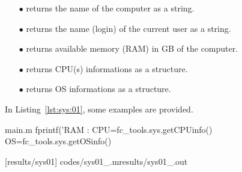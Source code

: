 
\begin{itemize}
\item[$\bullet$]  returns the name of the computer as a string.
\item[$\bullet$]  returns the name (login) of the current user as a string.
\item[$\bullet$]  returns available memory (RAM) in GB of the computer.
\item[$\bullet$]  returns CPU(s) informations as a structure.
\item[$\bullet$]  returns OS informations as a structure.
\end{itemize}

In Listing~\ref{lst:sys:01}, some examples are provided.
\begin{filecontents*}{main.m}
fprintf('RAM : %
CPU=fc_tools.sys.getCPUinfo()
OS=fc_tools.sys.getOSinfo()
\end{filecontents*}
[results/sys01]
%
                      {codes/sys01_\fccmdname\fccmdversionabr.m}{results/sys01_\fccmdname\fccmdversionabr.out}
